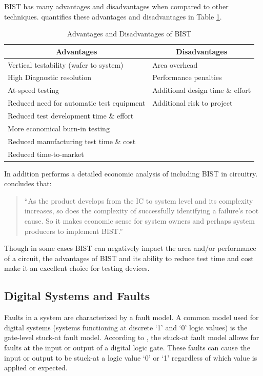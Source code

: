 \documentclass[12pt]{report}
\begin{document}
BIST has many advantages and disadvantages when compared to other techniques.  \cite{stroud} quantifies these advantages and disadvantages in Table \ref{tbl:advantages}. 
\begin{table}
	\caption{Advantages and Disadvantages of BIST\cite{stroud}}
	\begin{center}
	\begin{tabular}{|l|l|}
		\hline
		\multicolumn{1}{|c|}{{\bf Advantages}} & \multicolumn{1}{|c|}{{\bf Disadvantages}} \\ \hline
		Vertical testability (wafer to system) & Area overhead \\ \hline
		High Diagnostic resolution & Performance penalties \\ \hline
		At-speed testing & Additional design time \& effort \\ \hline
		Reduced need for automatic test equipment & Additional risk to project \\ \hline
		Reduced test development time \& effort & \\ \hline
		More economical burn-in testing & \\ \hline
		Reduced manufacturing test time \& cost & \\ \hline
		Reduced time-to-market & \\ \hline
	\end{tabular}
	\end{center}
	\label{tbl:advantages}
\end{table}
In addition \cite{ungar} performs a detailed economic analysis of including BIST in circuitry. \cite{ungar} concludes that:
\begin{quote}
``As the product develops from the IC to system level and its complexity increases, so does the complexity of successfully identifying a failure's root cause.  So it makes economic sense for system owners and perhaps system producers to implement BIST.\cite{ungar}''
\end{quote}
Though in some cases BIST can negatively impact the area and/or performance of a circuit, the advantages of BIST and its ability to reduce test time and cost make it an excellent choice for testing devices\cite{zorian}.

\subsection{Digital Systems and Faults}
\label{sct:digitalsystems}
Faults in a system are characterized by a fault model.  A common model used for digital systems (systems functioning at discrete `1' and `0' logic values) is the gate-level stuck-at fault model\cite{stroud}.  According to \cite{stroud}, the stuck-at fault model allows for faults at the input or output of a digital logic gate.  These faults can cause the input or output to be stuck-at a logic value `0' or `1' regardless of which value is applied or expected.  
\end{document}
